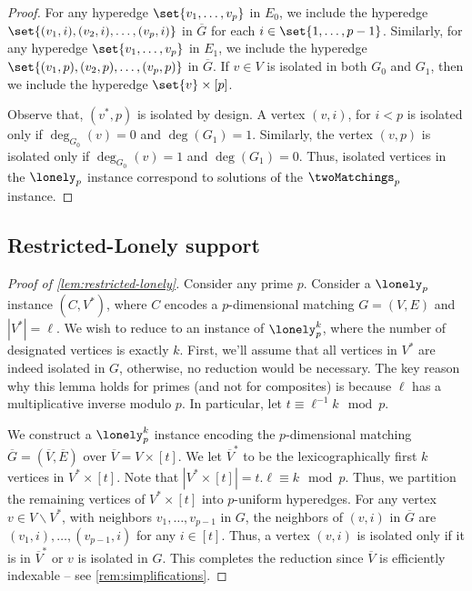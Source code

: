 \begin{proof}
For any hyperedge $\set{v_1, \ldots, v_p}$ in $E_0$, we include the hyperedge $\set{(v_1, i), (v_2, i), \ldots, (v_p,i)}$ in $\overline{G}$ for each $i \in \set{1, \ldots, p-1}$. Similarly, for any hyperedge $\set{v_1, \ldots, v_p}$ in $E_1$, we include the hyperedge $\set{(v_1, p), (v_2, p), \ldots, (v_p,p)}$ in $\overline{G}$. If $v \in V$ is isolated in both $G_0$ and $G_1$, then we include the hyperedge $\set{v} \times [p]$.

Observe that, $(v^*, p)$ is isolated by design. A vertex $(v,i)$, for $i < p$ is isolated only if $\deg_{G_0}(v) = 0$ and $\deg(G_1) = 1$. Similarly, the vertex $(v,p)$ is isolated only if $\deg_{G_0}(v) = 1$ and $\deg(G_1) = 0$. Thus, isolated vertices in the $\lonely_p$ instance correspond to solutions of the $\twoMatchings_p$ instance.
\end{proof}

\subsection{Restricted-Lonely support}\label{sec:pmod-equivalence}

\begin{proof}[Proof of \autoref{lem:restricted-lonely}]
Consider any prime $p$. Consider a $\lonely_p$ instance $(C, V^*)$, where $C$ encodes a $p$-dimensional matching $G = (V,E)$ and $|V^*| = \ell$. We wish to reduce to an instance of $\lonely_p^k$, where the number of designated vertices is exactly $k$. First, we'll assume that all vertices in $V^*$ are indeed isolated in $G$, otherwise, no reduction would be necessary. The key reason why this lemma holds for primes (and not for composites) is because $\ell$ has a multiplicative inverse modulo $p$. In particular, let $t \equiv \ell^{-1} k \mod{p}$.

We construct a $\lonely_p^k$ instance encoding the $p$-dimensional matching $\overline{G} = (\overline{V}, \overline{E})$ over $\overline{V} = V \times [t]$. We let $\overline{V}^*$ to be the lexicographically first $k$ vertices in $V^* \times [t]$. Note that $|V^* \times [t]| = t.\ell \equiv k \mod{p}$. Thus, we partition the remaining vertices of $V^* \times [t]$ into $p$-uniform hyperedges. For any vertex $v \in V \smallsetminus V^*$, with neighbors $v_1, \ldots, v_{p-1}$ in $G$, the neighbors of $(v,i)$ in $\overline{G}$ are $(v_1, i), \ldots, (v_{p-1}, i)$ for any $i \in [t]$. Thus, a vertex $(v,i)$ is isolated only if it is in $\overline{V}^*$ or $v$ is isolated in $G$. This completes the reduction since $\overline{V}$ is efficiently indexable -- see \autoref{rem:simplifications}.
\end{proof}


